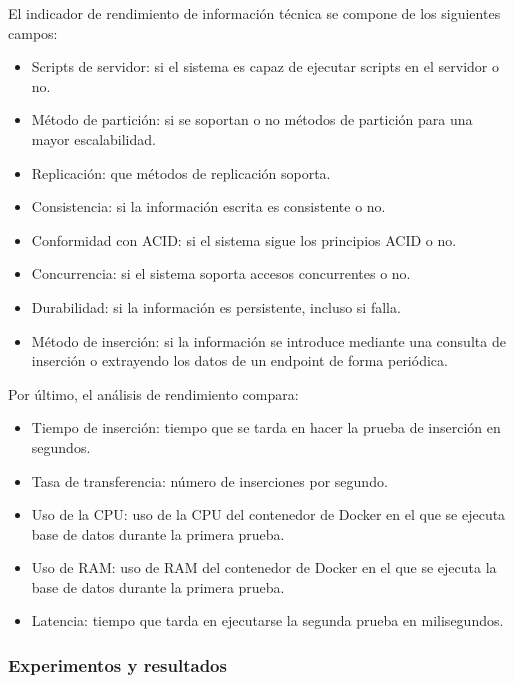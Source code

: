 El indicador de rendimiento de información técnica se compone de los siguientes campos:
\begin{itemize}
    \item Scripts de servidor: si el sistema es capaz de ejecutar scripts en el servidor o no.
    \item Método de partición: si se soportan o no métodos de partición para una mayor escalabilidad.
    \item Replicación: que métodos de replicación soporta.
    \item Consistencia: si la información escrita es consistente o no.
    \item Conformidad con ACID: si el sistema sigue los principios ACID o no.
    \item Concurrencia: si el sistema soporta accesos concurrentes o no.
    \item Durabilidad: si la información es persistente, incluso si falla.
    \item Método de inserción: si la información se introduce mediante una consulta de inserción o extrayendo los
        datos de un endpoint de forma periódica.
\end{itemize}


Por último, el análisis de rendimiento compara:
\begin{itemize}
    \item Tiempo de inserción: tiempo que se tarda en hacer la prueba de inserción en segundos.
    \item Tasa de transferencia: número de inserciones por segundo.
    \item Uso de la CPU: uso de la CPU del contenedor de Docker en el que se ejecuta base de datos durante 
        la primera prueba.
    \item Uso de RAM: uso de RAM del contenedor de Docker en el que se ejecuta la base de datos durante la
        primera prueba.
    \item Latencia: tiempo que tarda en ejecutarse la segunda prueba en milisegundos.
\end{itemize}

\subsubsection{Experimentos y resultados}

